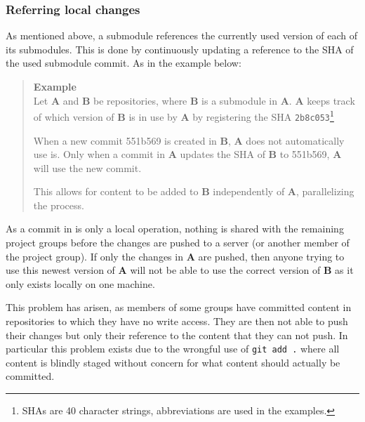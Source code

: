 \subsubsection{Referring local changes}\label{git:sub:sha}
As mentioned above, a \git{} submodule references the currently used version of each of its submodules.
This is done by continuously updating a reference to the SHA of the used submodule commit.
As in the example below:

\begin{quote}
\textbf{Example}\\
Let \textbf{A} and \textbf{B} be repositories, where \textbf{B} is a submodule in \textbf{A}.
\textbf{A} keeps track of which version of \textbf{B} is in use by \textbf{A} by registering the SHA \texttt{2b8c053}\footnote{\Git{} SHAs are 40 character strings, abbreviations are used in the examples.}

When a new commit 551b569 is created in \textbf{B}, \textbf{A} does not automatically use is.
Only when a commit in \textbf{A} updates the SHA of \textbf{B} to 551b569, \textbf{A} will use the new commit.

This allows for content to be added to \textbf{B} independently of \textbf{A}, parallelizing the process.
\end{quote}

As a commit in \git{} is only a local operation, nothing is shared with the remaining project groups before the changes are pushed to a server (or another member of the project group).
If only the changes in \textbf{A} are pushed, then anyone trying to use this newest version of \textbf{A} will not be able to use the correct version of \textbf{B} as it only exists locally on one machine.

This problem has arisen, as members of some groups have committed content in repositories to which they have no write access.
They are then not able to push their changes but only their reference to the content that they can not push.
In particular this problem exists due to the wrongful use of \texttt{git add .} where all content is blindly staged without concern for what content should actually be committed.

